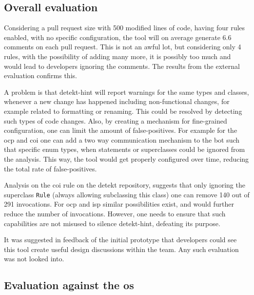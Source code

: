\documentclass{report}
\begin{document}
\subsection{Overall evaluation}
\label{evaluation-overall}

Considering a pull request size with 500 modified lines of code, having four rules enabled, with no specific configuration, the tool will on average generate 6.6 comments on each pull request. This is not an awful lot, but considering only 4 rules, with the possibility of adding many more, it is possibly too much and would lead to developers ignoring the comments. The results from the external evaluation confirms this.

A problem is that detekt-hint will report warnings for the same types and classes, whenever a new change has happened including non-functional changes, for example related to formatting or renaming. This could be resolved by detecting such types of code changes. Also, by creating a mechanism for fine-grained configuration, one can limit the amount of false-positives. For example for the \gls{ocp} and \gls{coi} one can add a two way communication mechanism to the bot such that specific enum types, when statements or superclasses could be ignored from the analysis. This way, the tool would get properly configured over time, reducing the total rate of false-positives. 

Analysis on the \gls{coi} rule on the detekt repository, suggests that only ignoring the superclass \texttt{Rule} (always allowing subclassing this class) one can remove 140 out of 291 invocations. For \gls{ocp} and \gls{isp} similar possibilities exist, and would further reduce the number of invocations. However, one needs to ensure that such capabilities are not misused to silence detekt-hint, defeating its purpose.

It was suggested in feedback of the initial prototype that developers could see this tool create useful design discussions within the team. Any such evaluation was not looked into. 




\subsection{Evaluation against the \gls{os}}
\end{document}
